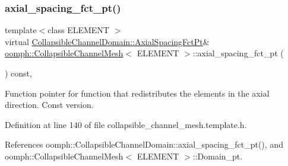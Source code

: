 \mbox{\label{classoomph_1_1CollapsibleChannelMesh_a7a615ef1fcb4cb422e3c78267818ceec}} 
\subsubsection{\texorpdfstring{axial\+\_\+spacing\+\_\+fct\+\_\+pt()}{axial\_spacing\_fct\_pt()}\hspace{0.1cm}{\footnotesize\ttfamily [2/2]}}
{\footnotesize\ttfamily template$<$class E\+L\+E\+M\+E\+NT $>$ \\
virtual \hyperlink{classoomph_1_1CollapsibleChannelDomain_a317472dab112beac771ecf6442a465f5}{Collapsible\+Channel\+Domain\+::\+Axial\+Spacing\+Fct\+Pt}\& \hyperlink{classoomph_1_1CollapsibleChannelMesh}{oomph\+::\+Collapsible\+Channel\+Mesh}$<$ E\+L\+E\+M\+E\+NT $>$\+::axial\+\_\+spacing\+\_\+fct\+\_\+pt (\begin{DoxyParamCaption}{ }\end{DoxyParamCaption}) const\hspace{0.3cm}{\ttfamily [inline]}, {\ttfamily [virtual]}}



Function pointer for function that redistributes the elements in the axial direction. Const version. 



Definition at line 140 of file collapsible\+\_\+channel\+\_\+mesh.\+template.\+h.



References oomph\+::\+Collapsible\+Channel\+Domain\+::axial\+\_\+spacing\+\_\+fct\+\_\+pt(), and oomph\+::\+Collapsible\+Channel\+Mesh$<$ E\+L\+E\+M\+E\+N\+T $>$\+::\+Domain\+\_\+pt.

\mbox{\label{classoomph_1_1CollapsibleChannelMesh_aac6057b4e572cb47923570b5e9c781c4}} 

